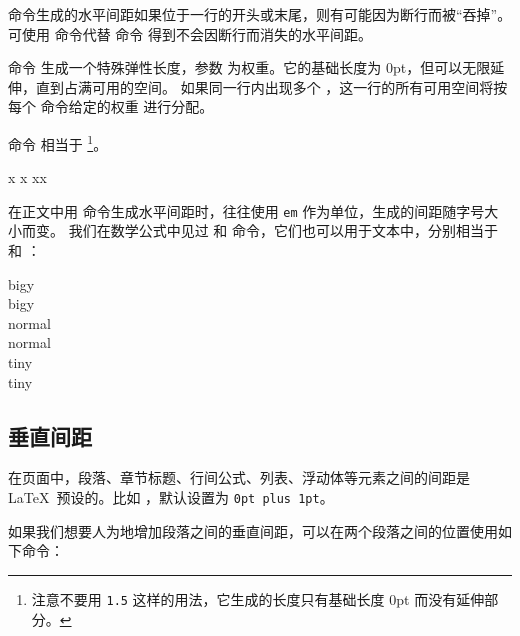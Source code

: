  命令生成的水平间距如果位于一行的开头或末尾，则有可能因为断行而被“吞掉”。可使用  命令代替  命令
得到不会因断行而消失的水平间距。

命令  生成一个特殊弹性长度，参数  为权重。它的基础长度为 0pt，但可以无限延伸，直到占满可用的空间。
如果同一行内出现多个 ，这一行的所有可用空间将按每个  命令给定的权重  进行分配。

命令  相当于 %
\footnote{注意不要用 \texttt{1.5} 这样的用法，它生成的长度只有基础长度 0pt 而没有延伸部分。}。

\begin{example}
x
x
x\hspace{\fill}x
\end{example}

在正文中用  命令生成水平间距时，往往使用 \texttt{em} 作为单位，生成的间距随字号大小而变。
我们在数学公式中见过  和  命令，它们也可以用于文本中，分别相当于 \marg*{1em} 和 \marg*{2em}：

\begin{example}
{\Large big\hspace{1em}y}\\
{\Large big\quad y}\\
nor\hspace{2em}mal\\
nor\qquad mal\\
{\tiny tin\hspace{1em}y}\\
{\tiny tin\quad y}
\end{example}

\subsection{垂直间距}\label{subsec:vspace}

在页面中，段落、章节标题、行间公式、列表、浮动体等元素之间的间距是 \LaTeX\ 预设的。比如  ，默认设置为 \texttt{0pt plus 1pt}。

如果我们想要人为地增加段落之间的垂直间距，可以在两个段落之间的位置使用如下命令：
\begin{command}
\end{command}

